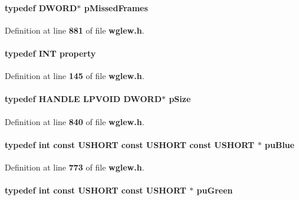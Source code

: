 \paragraph[{p\+Missed\+Frames}]{\setlength{\rightskip}{0pt plus 5cm}typedef D\+W\+O\+RD$\ast$ {\bf p\+Missed\+Frames}}\label{wglew_8h_a9e9c7376290e4339c8a14495d42f653c}


Definition at line {\bf 881} of file {\bf wglew.\+h}.

\paragraph[{property}]{\setlength{\rightskip}{0pt plus 5cm}typedef {\bf I\+NT} {\bf property}}\label{wglew_8h_a4d7487db9789a98afe326731754e5ff9}


Definition at line {\bf 145} of file {\bf wglew.\+h}.

\paragraph[{p\+Size}]{\setlength{\rightskip}{0pt plus 5cm}typedef {\bf H\+A\+N\+D\+LE} {\bf L\+P\+V\+O\+ID} D\+W\+O\+RD$\ast$ {\bf p\+Size}}\label{wglew_8h_a95e478a19268863e38a9733ac885ac14}


Definition at line {\bf 840} of file {\bf wglew.\+h}.

\paragraph[{pu\+Blue}]{\setlength{\rightskip}{0pt plus 5cm}typedef {\bf int} const U\+S\+H\+O\+RT const U\+S\+H\+O\+RT const U\+S\+H\+O\+RT $\ast$ {\bf pu\+Blue}}\label{wglew_8h_a666e1029071176cadae1ed0c23fd4636}


Definition at line {\bf 773} of file {\bf wglew.\+h}.

\paragraph[{pu\+Green}]{\setlength{\rightskip}{0pt plus 5cm}typedef {\bf int} const U\+S\+H\+O\+RT const U\+S\+H\+O\+RT $\ast$ {\bf pu\+Green}}\label{wglew_8h_a03b17731665646978289ab7559f7bb2d}



